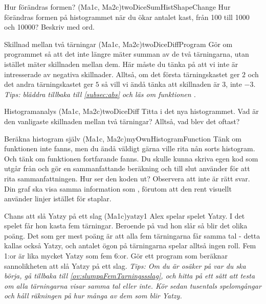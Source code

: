 \begin{matteovning}{Hur förändras formen? (Ma1c, Ma2c)}{twoDiceSumHistShapeChange}
Hur förändras formen på histogrammet när du ökar antalet kast, från 100 till 1000 och 10000? Beskriv med ord.
\end{matteovning}

\begin{matteovning}{Skillnad mellan två tärningar (Ma1c, Ma2c)}{twoDiceDiffProgram}
Gör om programmet så att det inte längre mäter summan av de två tärningarna, utan istället mäter skillnaden mellan dem. Här måste du tänka på att vi inte är intresserade av negativa skillnader. Alltså, om det första tärningskastet ger $2$ och det andra tärningskastet ger $5$ så vill vi ändå tänka att skillnaden är $3$, inte $-3$.
\newline
\newline
\emph{Tips: bläddra tillbaka till \autoref{subsec:abs} och läs om funktionen .}
\end{matteovning}

\begin{matteovning}{Histogramanalys (Ma1c, Ma2c)}{twoDiceDiff}
Titta i det nya histogrammet. Vad är den vanligaste skillnaden mellan två tärningar? Alltså, vad blev det oftast?
\end{matteovning}

\begin{matteovningm}{Beräkna histogram själv (Ma1c, Ma2c)}{myOwnHistogramFunction}
Tänk om funktionen  inte fanns, men du ändå väldigt gärna ville rita nån sorts histogram. Och tänk om funktionen  fortfarande fanns. Du skulle kunna skriva egen kod som utgår från  och gör en sammanfattande beräkning och till slut använder  för att rita sammanfattningen. Hur ser den koden ut? Observera att  inte är rätt svar. Din graf ska visa samma information som , förutom att den rent visuellt använder linjer istället för staplar.

\end{matteovningm}
\newpage
\begin{matteovning}{Chans att slå Yatzy på ett slag (Ma1c)}{yatzy1}
Alex spelar spelet Yatzy. I det spelet får hon kasta fem tärningar. Beroende på vad hon slår så blir det olika poäng. Det som ger mest poäng är att alla fem tärningarna får samma tal - detta kallas också Yatzy, och antalet ögon på tärningarna spelar alltså ingen roll. Fem 1:or är lika mycket Yatzy som fem 6:or. Gör ett program som beräknar sannolikheten att slå Yatzy på ett slag.
\newline
\newline
\emph{Tips: Om du är osäker på var du ska börja, gå tillbaka till \autoref{ov:slumpaFemTarningssslag}, och hitta på ett sätt att testa om alla tärningarna visar samma tal eller inte. Kör sedan tusentals spelomgångar och håll räkningen på hur många av dem som blir Yatzy.
}\end{matteovning}

